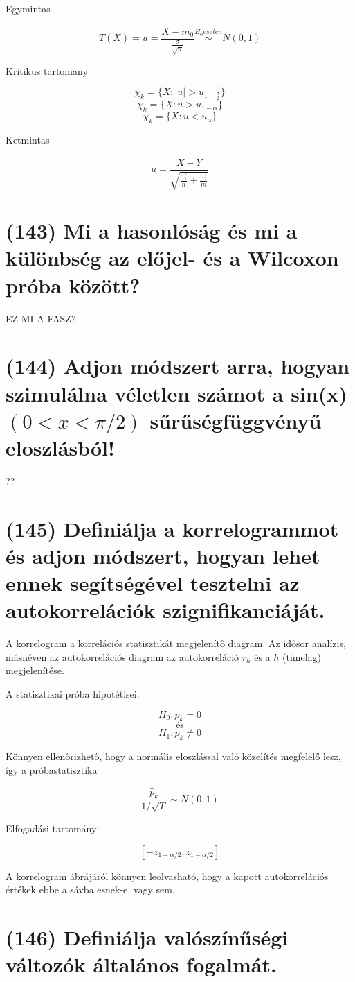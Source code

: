 \documentclass[12p]{article}
\begin{document}
Egymintas

$$T(X) = u = \frac{\overline{X} - m_0}{\frac{\sigma}{\sqrt{n}}} \stackrel{H_0 eseten}{\sim} N(0, 1)$$

Kritikus tartomany

$$\chi_k = \{X: |u| > u_{1-\frac{\sigma}{2}}\}$$
$$\chi_k = \{X: u > u_{1-\alpha}\}$$
$$\chi_k = \{X: u < u_\alpha\}$$

Ketmintas

$$\displaystyle{u = \frac{\overline{X} - \overline{Y}}{\sqrt{\frac{\sigma_1^2}{n} + \frac{\sigma_2^2}{m}}}}$$

\section{(143) Mi a hasonlóság és mi a különbség az előjel- és a Wilcoxon próba között?}

EZ MI A FASZ?

\section{(144) Adjon módszert arra, hogyan szimulálna véletlen számot a sin(x) $(0 < x < \pi/2)$ sűrűségfüggvényű eloszlásból!}

??

\section{(145) Definiálja a korrelogrammot és adjon módszert, hogyan lehet ennek segítségével tesztelni
az autokorrelációk szignifikanciáját.}

A korrelogram a korrelációs statisztikát megjelenítő diagram. Az idősor analízis, másnéven az autokorrelációs diagram az autokorreláció $r_h$ és a $h$ (timelag) megjelenítése.

A statisztikai próba hipotétisei:

$$H_0 : p_k = 0$$
\[
	\text{és}
\]
$$H_1 : p_k \neq 0$$

Könnyen ellenőrizhető, hogy a normális eloszlással való közelítés megfelelő
lesz, így a próbastatisztika

$$\frac{\hat{p}_k}{1/\sqrt{T}} \sim N(0,1) $$

Elfogadási tartomány:

$$[-z_{1-\alpha/2},z_{1-\alpha/2}]$$

A korrelogram ábrájáról könnyen leolvasható, hogy a kapott autokorrelációs
értékek ebbe a sávba esnek-e, vagy sem.

\section{(146) Definiálja valószínűségi változók általános fogalmát.}
\end{document}
